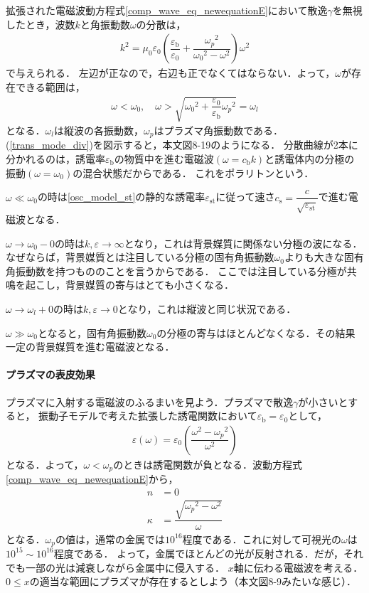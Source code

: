 拡張された電磁波動方程式\eqref{comp_wave_eq_newequationE}において散逸$\gamma$を無視したとき，波数$k$と角振動数$\omega$の分散は，
\begin{align}
  k^2=\mu_0\varepsilon_0\left(\dfrac{\varepsilon_{\text{b}}}{\varepsilon_0}+\dfrac{{\omega_p}^2}{{\omega_0}^2-\omega^2}\right)\omega^2\label{trans_mode_div}
\end{align}
で与えられる．
左辺が正なので，右辺も正でなくてはならない．よって，$\omega$が存在できる範囲は，
\begin{align}
  \omega < \omega_0 , \quad  \omega > \sqrt{{\omega_0}^2+\dfrac{\varepsilon_0}{\varepsilon_{\text{b}}}{\omega_p}^2} = \omega_l
\end{align}
となる．$\omega_l$は縦波の各振動数，$\omega_p$はプラズマ角振動数である．
(\ref{trans_mode_div})を図示すると，本文図8-19のようになる．
分散曲線が2本に分かれるのは，誘電率$\varepsilon_{\text{b}}$の物質中を進む電磁波$(\omega=c_{\text{b}}k)$と誘電体内の分極の振動$(\omega=\omega_0)$の混合状態だからである．
これをポラリトンという．

$\omega\ll\omega_0$の時は\eqref{osc_model_st}の静的な誘電率$\varepsilon_{\text{st}}$に従って速さ$c_{\text{s}}=\dfrac{c}{\sqrt{\varepsilon_{\text{st}}}}$で進む電磁波となる．

$\omega\to\omega_0-0$の時は$k,\varepsilon\to\infty$となり，これは背景媒質に関係ない分極の波になる．
なぜならば，背景媒質とは注目している分極の固有角振動数$\omega_0$よりも大きな固有角振動数を持つもののことを言うからである．
ここでは注目している分極が共鳴を起こし，背景媒質の寄与はとても小さくなる．

$\omega\to\omega_l+0$の時は$k,\varepsilon\to0$となり，これは縦波と同じ状況である．

$\omega\gg\omega_0$となると，固有角振動数$\omega_0$の分極の寄与はほとんどなくなる．その結果一定の背景媒質を進む電磁波となる．

\paragraph{プラズマの表皮効果}
プラズマに入射する電磁波のふるまいを見よう．プラズマで散逸$\gamma$が小さいとすると， 振動子モデルで考えた拡張した誘電関数において$\varepsilon_{\text{b}}=\varepsilon_0$として，
\begin{align}
  \varepsilon(\omega)=\varepsilon_0\left(\dfrac{\omega^2-{\omega_p}^2}{\omega^2}\right)
\end{align}
となる．よって，$\omega < \omega_p$のときは誘電関数が負となる．波動方程式\eqref{comp_wave_eq_newequationE}から，
\begin{align}
  n&=0\label{skin_eff_n}\\
  \kappa&=\dfrac{\sqrt{{{\omega_p}^2-\omega^2}}}{\omega}\label{skin_eff_kappa}
\end{align}
となる．$\omega_p$の値は，通常の金属では$10^{16}$程度である．これに対して可視光の$\omega$は$10^{15}\sim10^{16}$程度である．
よって，金属でほとんどの光が反射される．だが，それでも一部の光は減衰しながら金属中に侵入する．
$x$軸に伝わる電磁波を考える．$0\leq{x}$の適当な範囲にプラズマが存在するとしよう（本文図8-9みたいな感じ）．

